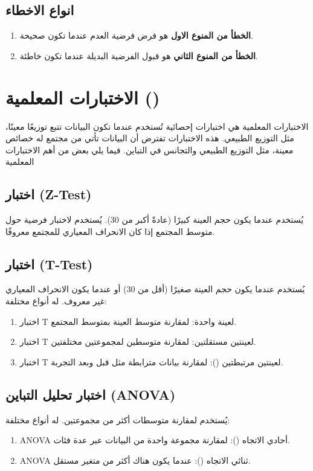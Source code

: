\subsection{انواع الاخطاء}
\begin{enumerate}
	\item \textbf{الخطأ من المنوع الاول} هو فرض فرضية العدم عندما تكون صحيحة.
	\item \textbf{الخطأ من المنوع الثاني} هو قبول الفرضية البديلة عندما تكون خاطئة.
\end{enumerate}

\section{الاختبارات المعلمية ()}
الاختبارات المعلمية هي اختبارات إحصائية تُستخدم عندما تكون البيانات تتبع توزيعًا معينًا، مثل التوزيع الطبيعي. هذه الاختبارات تفترض أن البيانات تأتي من مجتمع له خصائص معينة، مثل التوزيع الطبيعي والتجانس في التباين. فيما يلي بعض من أهم الاختبارات المعلمية

\subsection{اختبار (Z-Test)}
يُستخدم عندما يكون حجم العينة كبيرًا (عادةً أكبر من 30).
يُستخدم لاختبار فرضية حول متوسط المجتمع إذا كان الانحراف المعياري للمجتمع معروفًا.

\subsection{اختبار (T-Test)}
يُستخدم عندما يكون حجم العينة صغيرًا (أقل من 30) أو عندما يكون الانحراف المعياري غير معروف.
له أنواع مختلفة: 
\begin{enumerate}
\item  	اختبار T لعينة واحدة: لمقارنة متوسط العينة بمتوسط المجتمع.
\item  	اختبار T لعينتين مستقلتين: لمقارنة متوسطين لمجموعتين مختلفتين.
\item  	اختبار T لعينتين مرتبطتين (): لمقارنة بيانات مترابطة مثل قبل وبعد التجربة.
\end{enumerate}

\subsection{اختبار تحليل التباين (ANOVA)}
يُستخدم لمقارنة متوسطات أكثر من مجموعتين.
له أنواع مختلفة: 
\begin{enumerate}
\item  	ANOVA أحادي الاتجاه (): لمقارنة مجموعة واحدة من البيانات عبر عدة فئات.
\item  	ANOVA ثنائي الاتجاه (): عندما يكون هناك أكثر من متغير مستقل.
\end{enumerate}

